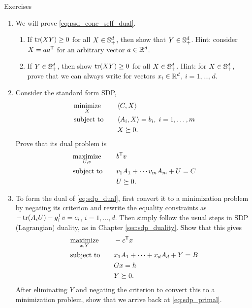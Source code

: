 \begin{xcb}{Exercises}
\begin{enumerate}[label=\thechapter.\arabic*]
\item \label{ex:psd_cone_self_dual}
  We will prove \eqref{eq:psd_cone_self_dual}. 

\begin{enumerate}[label=\alph*.]
\item If $\operatorname{tr}(XY) \geq 0$ for all $X \in \mathbb{S}_+^d$, then show that $Y \in
  \mathbb{S}_+^d$. Hint: consider $X = a a^{\mathsf{T}}$ for an arbitrary vector $a \in \mathbb{R}^d$.  

\item If $Y \in \mathbb{S}_+^d$, then show $\operatorname{tr}(XY) \geq 0$ for all $X \in
  \mathbb{S}_+^d$. Hint: for $X \in \mathbb{S}_+^d$, prove that we can always write  for vectors $x_i \in \mathbb{R}^d$, $i = 1,\dots,d$. 
\end{enumerate}

\item \label{ex:sdp_std_dual} 
  Consider the standard form SDP,
  \begin{alignat*}{2}
  &\operatorname*{minimize}_X \quad && \langle C, X \rangle \\
  &\operatorname{subject\,\,to} \quad && \langle A_i, X \rangle = b_i, \; i=1,\dots,m \\
  & && X \succeq 0.
  \end{alignat*}
  Prove that its dual problem is 
  \begin{alignat*}{2}
  &\operatorname*{maximize}_{U,v} \quad && b^{\mathsf{T}} v \\
  &\operatorname{subject\,\,to} \quad && v_1 A_1 + \cdots v_m A_m + U = C \\
  & && U \succeq 0.
  \end{alignat*}

\item \label{ex:sdp_dual_dual}
  To form the dual of \eqref{eq:sdp_dual}, first convert it to a minimization
  problem by negating its criterion and rewrite the equality constraints as
  $-\operatorname{tr}(A_iU) - g_i^{\mathsf{T}} v = c_i$, $i = 1,\dots,d$. Then simply follow the usual
  steps in SDP (Lagrangian) duality, as in Chapter \ref{sec:sdp_duality}. Show
  that this gives    
  \begin{alignat*}{2}
  &\operatorname*{maximize}_{x,Y} \quad && -c^{\mathsf{T}} x \\ 
  &\operatorname{subject\,\,to} \quad && x_1 A_1 + \cdots + x_d A_d + Y = B \\
  & && Gx = h \\
  & && Y \succeq 0.
  \end{alignat*}
  After eliminating $Y$ and negating the criterion to convert this to a
  minimization problem, show that we arrive back at \eqref{eq:sdp_primal}.  


\end{enumerate}
\end{xcb}
